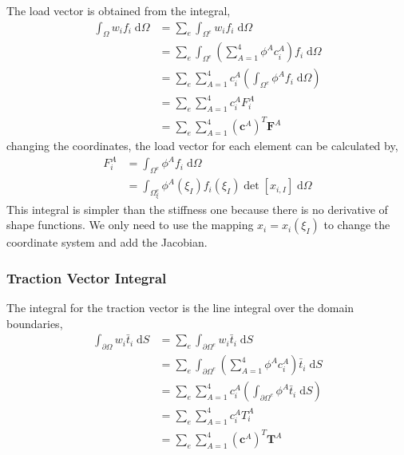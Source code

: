 \documentclass[11pt, a4paper]{article}
\numberwithin{equation}{section}
\begin{document}
The load vector is obtained from the integral,
\begin{align*}
\int_\Omega w_i f_i \; \mathrm{d} \Omega 
&=
\sum_e \int_{\Omega^e} w_i f_i \; \mathrm{d} \Omega 
\\
&=
\sum_e \int_{\Omega^e} \left( \sum_{A=1}^4 \phi^A c_i^A \right)  f_i \; \mathrm{d} \Omega 
\\
&=
\sum_e \sum_{A=1}^4  c_i^A  \left( \int_{\Omega^e} \phi^A f_i \; \mathrm{d} \Omega \right)
\\
&=
\sum_e \sum_{A=1}^4  c_i^A F_i^A 
\\
&=
\sum_e \sum_{A=1}^4  (\mathbf{c}^A)^T \mathbf{F}^A
\end{align*}
changing the coordinates, the load vector for each element can be calculated by,
\begin{align*}
F_i^A &= \int_{\Omega^e} \phi^A f_i \; \mathrm{d} \Omega 
\\
&=
\int_{\Omega^e_\xi} \phi^A(\xi_I) f_i(\xi_I) \det[x_{i,I}] \; \mathrm{d} \Omega
\end{align*}
This integral is simpler than the stiffness one because there is no derivative of shape functions. We only need to use the mapping $x_i = x_i(\xi_I)$ to change the coordinate system and add the Jacobian.

\subsubsection{Traction Vector Integral}

The integral for the traction vector is the line integral over the domain boundaries,
\begin{align*}
\int_{\partial \Omega} w_i \bar{t}_i \; \mathrm{d} S
&=
\sum_e \int_{\partial \Omega^e} w_i \bar{t}_i \; \mathrm{d} S
\\
&=
\sum_e \int_{\partial \Omega^e} \left( \sum_{A=1}^4 \phi^A c_i^A \right) \bar{t}_i \; \mathrm{d} S
\\
&=
\sum_e \sum_{A=1}^4 c_i^A \left( \int_{\partial \Omega^e} \phi^A \bar{t}_i \; \mathrm{d} S\right)  
\\
&=
\sum_e \sum_{A=1}^4  c_i^A T_i^A 
\\
&=
\sum_e \sum_{A=1}^4  (\mathbf{c}^A)^T \mathbf{T}^A
\end{align*}
\end{document}
